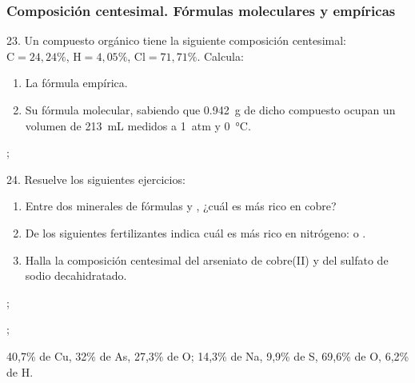 \documentclass[11pt]{article}
\begin{document}
\begin{multicols}{2}
\subsubsection{Composición centesimal. Fórmulas moleculares y empíricas}

\begin{exercise}
  23. Un compuesto orgánico tiene la siguiente composición centesimal: $\textrm{C} = 24,24\%$, $\textrm{H} = 4,05\%$, $\textrm{Cl} = 71,71\%.$ Calcula:
  \begin{enumerate}
    \item La fórmula empírica.
    \item Su fórmula molecular, sabiendo que \SI{0.942}{\gram} de dicho compuesto ocupan un volumen de \SI{213}{\milli\liter} medidos a \SI{1}{atm} y \SI{0}{\celsius}.
  \end{enumerate}
\end{exercise}
\begin{solution}
  \begin{enumerate*}
    \item {};
    \item {}
  \end{enumerate*}

\end{solution}

\begin{exercise}
  24. Resuelve los siguientes ejercicios:
  \begin{enumerate}
    \item Entre dos minerales de fórmulas  y , ¿cuál es más rico en cobre?
    \item De los siguientes fertilizantes indica cuál es más rico en nitrógeno:  o .
    \item Halla la composición centesimal del arseniato de cobre(II)
    y del sulfato de sodio decahidratado.
  \end{enumerate}
\end{exercise}
\begin{solution}
  \begin{enumerate*}
    \item {};
    \item {};
    \item 40,7\% de Cu, 32\% de As, 27,3\% de O; 14,3\% de Na, 9,9\% de S, 69,6\% de O, 6,2\% de H.
  \end{enumerate*}
\end{solution}





\end{multicols}
\end{document}
